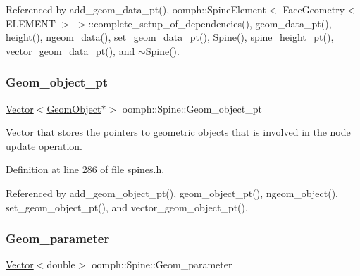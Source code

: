 Referenced by add\+\_\+geom\+\_\+data\+\_\+pt(), oomph\+::\+Spine\+Element$<$ Face\+Geometry$<$ E\+L\+E\+M\+E\+N\+T $>$ $>$\+::complete\+\_\+setup\+\_\+of\+\_\+dependencies(), geom\+\_\+data\+\_\+pt(), height(), ngeom\+\_\+data(), set\+\_\+geom\+\_\+data\+\_\+pt(), Spine(), spine\+\_\+height\+\_\+pt(), vector\+\_\+geom\+\_\+data\+\_\+pt(), and $\sim$\+Spine().

\mbox{\label{classoomph_1_1Spine_aa5bf17dd0cd4f4acda73273a3227ef09}} 
\subsubsection{\texorpdfstring{Geom\+\_\+object\+\_\+pt}{Geom\_object\_pt}}
{\footnotesize\ttfamily \hyperlink{classoomph_1_1Vector}{Vector}$<$\hyperlink{classoomph_1_1GeomObject}{Geom\+Object}$\ast$$>$ oomph\+::\+Spine\+::\+Geom\+\_\+object\+\_\+pt\hspace{0.3cm}{\ttfamily [private]}}



\hyperlink{classoomph_1_1Vector}{Vector} that stores the pointers to geometric objects that is involved in the node update operation. 



Definition at line 286 of file spines.\+h.



Referenced by add\+\_\+geom\+\_\+object\+\_\+pt(), geom\+\_\+object\+\_\+pt(), ngeom\+\_\+object(), set\+\_\+geom\+\_\+object\+\_\+pt(), and vector\+\_\+geom\+\_\+object\+\_\+pt().

\mbox{\label{classoomph_1_1Spine_aa368ebf715af6b0c6da70ad68ed0ec91}} 
\subsubsection{\texorpdfstring{Geom\+\_\+parameter}{Geom\_parameter}}
{\footnotesize\ttfamily \hyperlink{classoomph_1_1Vector}{Vector}$<$double$>$ oomph\+::\+Spine\+::\+Geom\+\_\+parameter\hspace{0.3cm}{\ttfamily [private]}}



